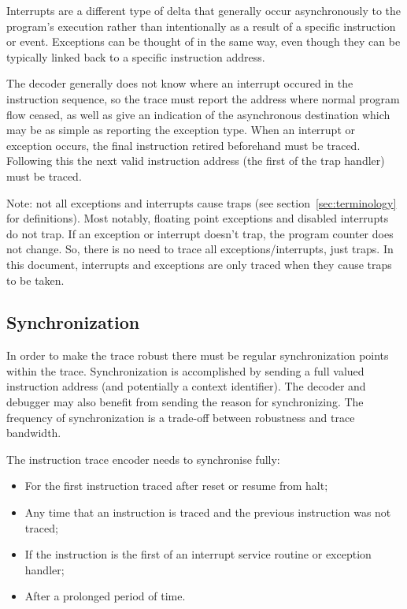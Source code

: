 Interrupts are a different type of delta that generally occur
asynchronously to the program's execution rather than intentionally as
a result of a specific instruction or event. Exceptions can be thought
of in the same way, even though they can be typically linked back to a
specific instruction address.

The decoder generally does not know
where an interrupt occured in the instruction sequence, so the trace
must report the address where normal program flow ceased, as well as
give an indication of the asynchronous destination which may be as
simple as reporting the exception type.  When an interrupt or
exception occurs, the final instruction retired beforehand must be traced.  
Following this the next valid instruction address (the first of the
trap handler) must be traced.

Note: not all exceptions and interrupts cause traps (see 
section~\ref{sec:terminology} for definitions). Most notably, 
floating point exceptions and disabled interrupts do not trap.
If an exception or interrupt doesn't trap, the program counter does not
change. So, there is no need to trace all exceptions/interrupts, just
traps.  In this document, interrupts and exceptions are only traced when 
they cause traps to be taken.

\subsection{Synchronization} \label{synchronization}

In order to make the trace robust there must be regular
synchronization points within the trace. Synchronization is accomplished by
sending a full valued instruction address (and potentially a context
identifier). The decoder and debugger may also benefit from sending
the reason for synchronizing. The frequency of synchronization is a
trade-off between robustness and trace bandwidth.

The instruction trace encoder needs to synchronise fully:

\begin{itemize}

\item For the first instruction traced after reset or resume from halt;
\item Any time that an instruction is traced and the previous instruction was not traced;
\item If the instruction is the first of an interrupt service routine or
exception handler;
\item After a prolonged period of time.
\end{itemize}

